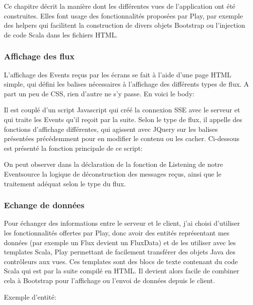 \documentclass[french]{article}
\begin{document}
Ce chapitre décrit la manière dont les différentes vues de l'application ont été construites. Elles font usage des fonctionnalités proposées par Play, par exemple des helpers qui facilitent la construction de divers objets Bootstrap ou l'injection de code Scala dans les fichiers HTML.

\subsubsection{Affichage des flux}

L'affichage des Events reçus par les écrans se fait à l'aide d'une page HTML simple, qui défini les balises nécessaires à l'affichage des différents types de flux. A part un peu de CSS, rien d'autre ne s'y passe. En voici le body:



Il est couplé d'un script Javascript qui créé la connexion SSE avec le serveur et qui traite les Events qu'il reçoit par la suite. Selon le type de flux, il appelle des fonctions d'affichage différentes, qui agissent avec JQuery sur les balises présentées précédemment pour en modifier le contenu ou les cacher. Ci-dessous est présenté la fonction principale de ce script:



On peut observer dans la déclaration de la fonction de Listening de notre Eventsource la logique de déconstruction des messages reçus, ainsi que le traitement adéquat selon le type du flux.


\subsubsection{Echange de données}

Pour échanger des informations entre le serveur et le client, j'ai choisi  d'utiliser les fonctionnalités offertes par Play, donc avoir des entités représentant mes données (par exemple un Flux devient un FluxData) et de les utiliser avec les templates Scala, Play permettant de facilement transférer des objets Java des contrôleurs aux vues. Ces templates sont des blocs de texte contenant du code Scala qui est par la suite compilé en HTML. Il devient alors facile de combiner cela à Bootstrap pour l'affichage ou l'envoi de données depuis le client.

Exemple d'entité:

\end{document}
